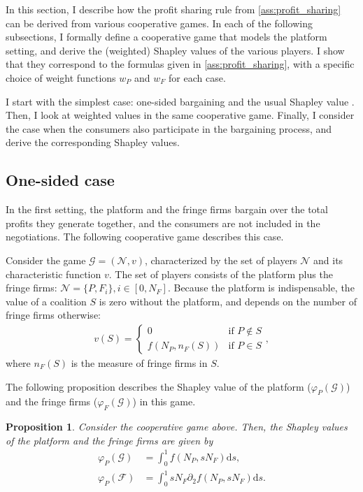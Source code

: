 \documentclass[a4paper]{article}
\newtheorem{proposition}{Proposition}
\newcommand{\ds}{\mathrm{d}s}
\begin{document}
In this section, I describe how the profit sharing rule from \cref{ass:profit_sharing} can be derived from various cooperative games.
In each of the following subsections, I formally define a cooperative game that models the platform setting, and derive the (weighted) Shapley values of the various players.
I show that they correspond to the formulas given in \cref{ass:profit_sharing}, with a specific choice of weight functions $w_P$ and $w_F$ for each case.

I start with the simplest case: one-sided bargaining and the usual Shapley value \parencite{shapley1953additive}.
Then, I look at weighted values \parencite{weber1988probabilistic} in the same cooperative game.
Finally, I consider the case when the consumers also participate in the bargaining process, and derive the corresponding Shapley values.

\subsection{One-sided case}
\label{sec:cooperative_game_one_sided}

In the first setting, the platform and the fringe firms bargain over the total profits they generate together, and the consumers are not included in the negotiations.
The following cooperative game describes this case.

Consider the game $\mathcal{G} = (\mathcal{N}, v)$, characterized by the set of players $\mathcal{N}$ and its characteristic function $v$.
The set of players consists of the platform plus the fringe firms: $\mathcal{N} = \{P, F_i\}, i \in [0, N_F]$.
Because the platform is indispensable, the value of a coalition $S$ is zero without the platform, and depends on the number of fringe firms otherwise:
\begin{align*}
    v(S) = \begin{cases}
        0 & \text{if } P \notin S \\
        f(N_P, n_F(S)) & \text{if } P \in S
    \end{cases},
\end{align*}
where $n_F(S)$ is the measure of fringe firms in $S$.

The following proposition describes the Shapley value of the platform ($\varphi_P(\mathcal{G})$) and the fringe firms ($\varphi_F(\mathcal{G})$) in this game.

\begin{proposition}
    \label{prop:profit_sharing_one_sided}
    Consider the cooperative game above.
    Then, the Shapley values of the platform and the fringe firms are given by
    \begin{align*}
        \varphi_P(\mathcal{G}) &= \int_0^1 f(N_P, s N_F) \ds, \\
        \varphi_P(\mathcal{F}) &= \int_0^1 s N_F \partial_2 f(N_P, s N_F) \ds.
    \end{align*}
\end{proposition}
\end{document}
